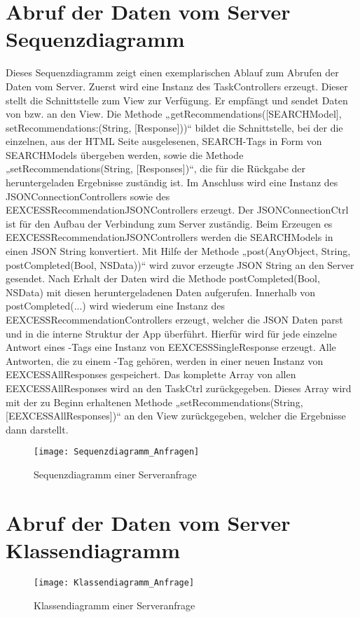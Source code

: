 \pagebreak

\section{Abruf der Daten vom Server Sequenzdiagramm}

Dieses Sequenzdiagramm zeigt einen exemplarischen Ablauf zum Abrufen der Daten vom Server. Zuerst wird eine Instanz des TaskControllers erzeugt. Dieser stellt die Schnittstelle zum View zur Verfügung. Er empfängt und sendet Daten von bzw. an den View. Die Methode „getRecommendations([SEARCHModel], setRecommendations:(String, [Response]))“ bildet die Schnittstelle, bei der die einzelnen, aus der HTML Seite ausgelesenen, SEARCH-Tags in Form von SEARCHModels übergeben werden, sowie die Methode „setRecommendations(String, [Responses])“, die für die Rückgabe der heruntergeladen Ergebnisse zuständig ist. Im Anschluss wird eine Instanz des JSONConnectionControllers sowie des EEXCESSRecommendationJSONControllers erzeugt. Der JSONConnectionCtrl ist für den Aufbau der Verbindung zum Server zuständig. Beim Erzeugen es EEXCESSRecommendationJSONControllers werden die SEARCHModels in einen JSON String konvertiert. Mit Hilfe der Methode „post(AnyObject, String, postCompleted(Bool, NSData))“ wird zuvor erzeugte JSON String an den Server gesendet. Nach Erhalt der Daten wird die Methode postCompleted(Bool, NSData) mit diesen heruntergeladenen Daten aufgerufen. Innerhalb von 
postCompleted(...) wird wiederum eine Instanz des EEXCESSRecommendationControllers erzeugt, welcher die JSON Daten parst und in die interne Struktur der App überführt. Hierfür wird für jede einzelne Antwort eines \SEARCH-Tags eine Instanz von EEXCESSSingleResponse erzeugt. Alle Antworten, die zu einem \SEARCH-Tag gehören, werden in einer neuen Instanz von EEXCESSAllResponses gespeichert.  Das komplette Array von allen EEXCESSAllResponses wird an den TaskCtrl zurückgegeben. Dieses Array wird mit der zu Beginn erhaltenen Methode „setRecommendations(String, [EEXCESSAllResponses])“ an den View zurückgegeben, welcher die Ergebnisse dann darstellt. 

\begin{figure}
	\centering
	\texttt{[image: Sequenzdiagramm\_Anfragen]}
	\caption{Sequenzdiagramm einer Serveranfrage}
	\label{fig:Anfrage Sequenzdiagramm}
\end{figure}

\pagebreak

\section{Abruf der Daten vom Server Klassendiagramm}

\begin{figure}
	\centering
	\texttt{[image: Klassendiagramm\_Anfrage]}
	\caption{Klassendiagramm einer Serveranfrage}
	\label{fig:Anfrage Klassendiagramm}
\end{figure}

\pagebreak
